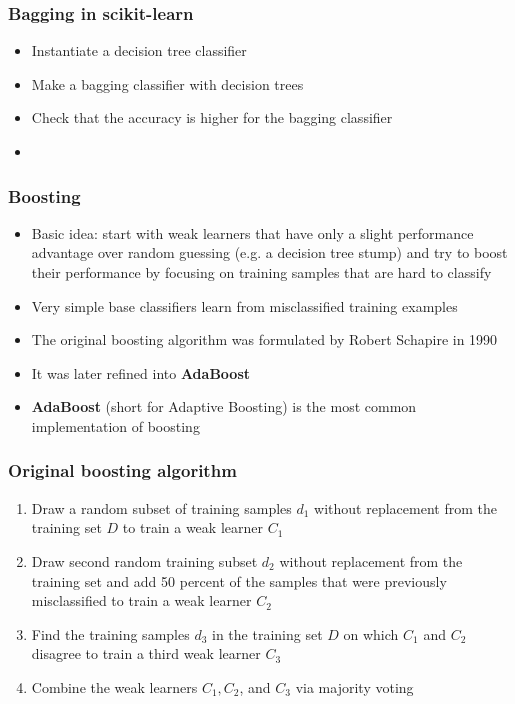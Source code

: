 \documentclass{beamer}
\begin{document}
\begin{frame}
  \frametitle{Bagging in scikit-learn}
  \begin{itemize}
  \item Instantiate a decision tree classifier
  \item Make a bagging classifier with decision trees
  \item Check that the accuracy is higher for the bagging classifier
  \item \href{https://github.com/rasbt/python-machine-learning-book/blob/master/code/ch07/ch07.ipynb}{}
  \end{itemize}
\end{frame}

\begin{frame}
  \frametitle{Boosting}
  \begin{itemize}
  \item Basic idea: start with weak learners that have only a slight performance advantage over random guessing (e.g. a decision tree stump) and try to boost their performance by focusing on training samples that are hard to classify
  \item Very simple base classifiers learn from misclassified training examples
  \item The original boosting algorithm was formulated by Robert Schapire in 1990
  \item It was later refined into \textbf{AdaBoost}
  \item \textbf{AdaBoost} (short for Adaptive Boosting) is the most common implementation of boosting
  \end{itemize}
\end{frame}

\begin{frame}
  \frametitle{Original boosting algorithm}
  \begin{enumerate}
  \item Draw a random subset of training samples $d_1$ without replacement from the training set $D$ to train a weak learner $C_1$
  \item Draw second random training subset $d_2$ without replacement from the training set and add 50 percent of the samples that were previously misclassified to train a weak learner $C_2$
  \item Find the training samples $d_3$ in the training set $D$ on which $C_1$ and $C_2$ disagree to train a third weak learner $C_3$
  \item Combine the weak learners $C_1, C_2$, and $C_3$ via majority voting
  \end{enumerate}
\end{frame}
\end{document}
